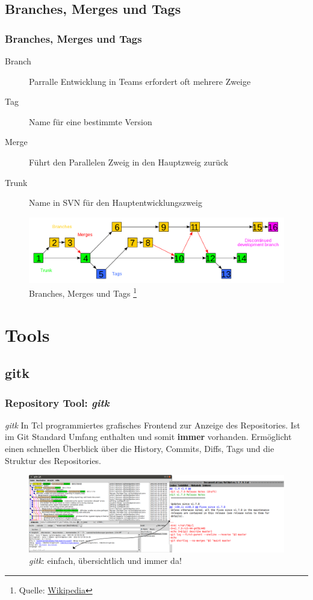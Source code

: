 \documentclass{beamer}
\begin{document}
\subsection{Branches, Merges und Tags}
\begin{frame}\frametitle{Branches, Merges und Tags}
\begin{description}
\item[Branch] Parralle Entwicklung in Teams erfordert oft mehrere Zweige
\item[Tag] Name für eine bestimmte Version 
\item[Merge] Führt den Parallelen Zweig in den Hauptzweig zurück
\item[Trunk] Name in SVN für den Hauptentwicklungszweig
\end{description}

\begin{figure}
\includegraphics[scale=0.15]{2000px-Subversion_project_visualization} 
\caption{Branches, Merges und Tags \footnote{Quelle: \href{http://en.wikipedia.org/wiki/File:Subversion_project_visualization.svg}{Wikipedia}}}
\end{figure}


\end{frame}

\section{Tools}
\subsection{gitk}
\begin{frame}\frametitle{Repository Tool: \textit{gitk}}
\begin{block}{\textit{gitk}}
In Tcl programmiertes grafisches Frontend zur Anzeige des Repositories. Ist im Git Standard Umfang enthalten und somit \textbf{immer} vorhanden. Ermöglicht einen schnellen Überblick über die History, Commits, Diffs, Tags und die Struktur des Repositories. 
\end{block}

\begin{figure}
\includegraphics[scale=0.7]{Bilder/gitk} 
\caption{\textit{gitk}: einfach, übersichtlich und immer da!}
\end{figure}
\end{frame}
\end{document}
